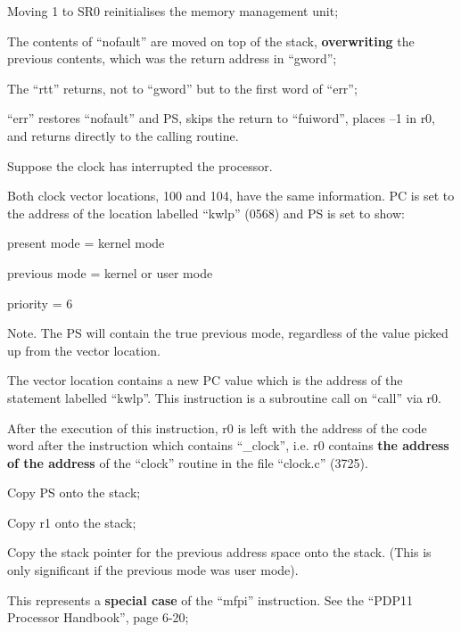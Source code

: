 \item[0765:] Moving 1 to SR0 reinitialises the
 memory management unit;

\item[0766:] The contents of ``nofault'' are
 moved on top of the stack,
 {\bf overwriting} the previous contents, which was the return
 address in ``gword'';

\item[0767:] The ``rtt'' returns, not to ``gword''
 but to the first word of ``err'';

\item[0880:] ``err'' restores ``nofault'' and PS,
 skips the return to ``fuiword'',
 places --1 in r0, and returns
 directly to the calling routine.
\ed


Suppose the clock has interrupted the
processor.


Both clock vector locations, 100 and
104, have the same information. PC is
set to the address of the location
labelled ``kwlp'' (0568) and PS is set to
show:

 present mode = kernel mode

 previous mode = kernel or user mode

 priority = 6


\noindent Note.
The PS will contain the true previous mode, regardless of the value
picked up from the vector location.

\bd
\item[0570:] The vector location contains a
 new PC value which is the address
 of the statement labelled ``kwlp''.
 This instruction is a subroutine
 call on ``call'' via r0.

 After the execution of this
 instruction, r0 is left with the
 address of the code word after
 the instruction which contains
 ``\_clock'', i.e. r0 contains {\bf the
 address of the address} of the
 ``clock'' routine in the file
 ``clock.c'' (3725).
\ed


\bd
\item[0777:] Copy PS onto the stack;

\item[0779:] Copy r1 onto the stack;

\item[0780:] Copy the stack pointer for the
 previous address space onto the
 stack. (This is only significant
 if the previous mode was user
 mode).

This represents a {\bf special case} of
the ``mfpi'' instruction. See the
``PDP11 Processor Handbook'', page
6-20;


